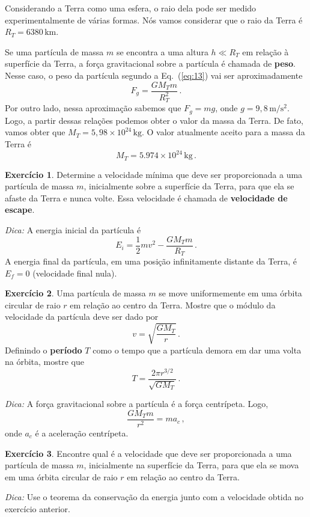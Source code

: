 \documentclass[papersize=a4,DIV=calc,twocolumn=on]{scrartcl}
\theoremstyle{definition}
\newtheorem{ex}{Exercício}[section]
\begin{document}
Considerando a Terra como uma esfera, o raio dela pode ser medido
experimentalmente de várias formas. Nós vamos considerar que o raio da
Terra é $R_T=6380\,\mathrm{km}$.

Se uma partícula de massa $m$ se encontra a uma altura $h\ll R_T$ em
relação à superfície da Terra, a força gravitacional sobre a partícula
é chamada de \textbf{peso}. Nesse caso, o peso da partícula segundo a
Eq.~(\ref{eq:13}) vai ser aproximadamente
$$F_g=\frac{GM_Tm}{R_T^2}\,.$$
Por outro lado, nessa aproximação sabemos que $F_g=mg$, onde
$g=9{,}8\,\mathrm{m}/\mathrm{s}^2$. Logo, a partir dessas relações
podemos obter o valor da massa da Terra. De fato, vamos obter que
$M_T=5{,}98\times 10^{24}\,\mathrm{kg}$. O valor atualmente aceito
para a massa da Terra é
$$M_T=5.974\times 10^{24}\,\mathrm{kg}\,.$$

\begin{ex}
  Determine a velocidade mínima que deve ser proporcionada a uma
  partícula de massa $m$, inicialmente sobre a superfície da Terra,
  para que ela se afaste da Terra e nunca volte. Essa velocidade é
  chamada de \textbf{velocidade de escape}.

  \noindent\textit{Dica:} A energia inicial da partícula é
  $$E_i=\frac{1}{2}mv^2-\frac{GM_Tm}{R_T}\,.$$
  A energia final da partícula, em uma posição infinitamente distante
  da Terra, é $E_f=0$ (velocidade final nula).
\end{ex}

\begin{ex}
  Uma partícula de massa $m$ se move uniformemente em uma órbita
  circular de raio $r$ em relação ao centro da Terra. Mostre que o
  módulo da velocidade da partícula deve ser dado por
  $$v=\sqrt{\frac{GM_T}{r}}\,.$$
  Definindo o \textbf{período} $T$ como o tempo que a partícula demora
  em dar uma volta na órbita, mostre que
  $$T=\frac{2\pi r^{3/2}}{\sqrt{GM_T}}\,.$$

  \noindent\textit{Dica:} A força gravitacional sobre a partícula é a
  força centrípeta. Logo,
  $$\frac{GM_Tm}{r^2}=ma_c\,,$$ 
  onde $a_c$ é a aceleração centrípeta.
\end{ex}

\begin{ex}
  Encontre qual é a velocidade que deve ser proporcionada a uma
  partícula de massa $m$, inicialmente na superfície da Terra, para
  que ela se mova em uma órbita circular de raio $r$ em relação ao
  centro da Terra.

  \noindent\textit{Dica:} Use o teorema da conservação da energia
  junto com a velocidade obtida no exercício anterior.
\end{ex}
\end{document}
